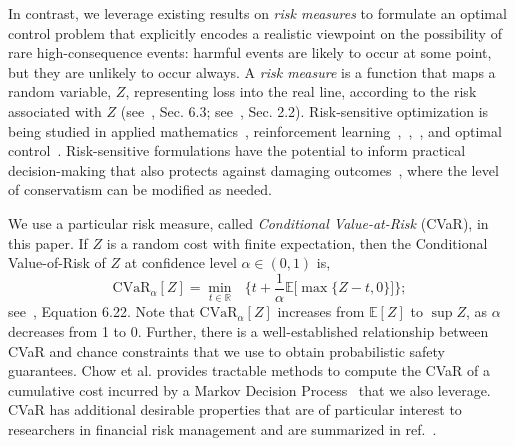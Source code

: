 \documentclass[letterpaper, 10 pt, conference]{ieeeconf}  %
\begin{document}
In contrast, we leverage existing results on \textit{risk measures} to formulate an optimal control problem
that explicitly encodes a realistic viewpoint on the possibility of rare high-consequence events: 
harmful events are likely to occur at some point, but they are unlikely to occur always.
A \textit{risk measure} is a function that maps a random variable, $Z$, representing loss into the real line,
according to the risk associated with $Z$ (see~\cite{shapiro2009lectures}, Sec. 6.3; see~\cite{kisiala2015conditional}, Sec. 2.2).
Risk-sensitive optimization
is being studied in applied mathematics~\cite{ruszczynski2010risk}, reinforcement learning~\cite{osogami2012robustness},~\cite{chow2015risk},~\cite{ratliff2017risk}, and optimal control~\cite{chow2014framework}.\footnotemark
{} 
Risk-sensitive formulations have the potential to inform practical decision-making that also protects
against damaging outcomes~\cite{serraino2013conditional}, where the level of conservatism can be modified as needed.

We use a particular risk measure, called \textit{Conditional Value-at-Risk} (CVaR), in this paper.
If $Z$ is a random cost with finite expectation, then the Conditional Value-of-Risk of $Z$ at confidence level $\alpha \in (0,1)$
is, 
\begin{equation}
\text{CVaR}_\alpha[Z] = {\underset{t \in \mathbb{R}}\min} \text{ }\Big\{ t + \frac{1}{\alpha}\mathbb{E}\big[\max\{Z-t,0\}\big] \Big\};
\label{cvareqn}
\end{equation}
see~\cite{shapiro2009lectures}, Equation 6.22.\footnotemark
{}
Note that $\text{CVaR}_\alpha[Z]$ increases from $\mathbb{E}[Z]$ to $\sup Z$, as $\alpha$ decreases from 1 to 0.\footnotemark
{}
Further, there is a well-established relationship between CVaR and chance constraints
that we use to obtain probabilistic safety guarantees. 
Chow et al. provides tractable methods to compute the CVaR of a cumulative cost
incurred by a Markov Decision Process~\cite{chow2015risk} that we also leverage.
CVaR has additional desirable properties that are of particular interest to researchers in financial risk management and are summarized in ref.~\cite{serraino2013conditional}. 
\end{document}
